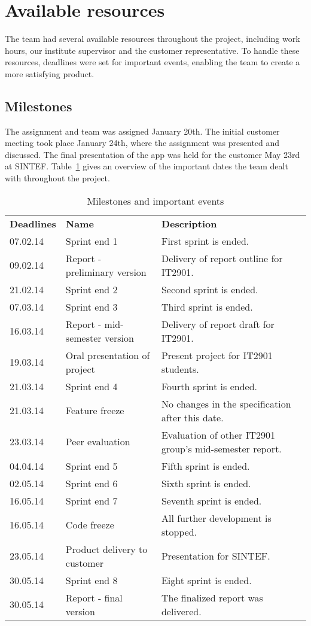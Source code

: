 \section{Available resources}
\label{sec:availResources}
The team had several available resources throughout the project, including work hours, our institute supervisor and the customer representative. To handle these resources, deadlines were set for important events, enabling the team to create a more satisfying product.

\subsection{Milestones}

The assignment and team was assigned January 20th. The initial customer meeting took place January 24th, where the assignment was presented and discussed. The final presentation of the app was held for the customer May 23rd at SINTEF. Table~\ref{tab:milestones} gives an overview of the important dates the team dealt with throughout the project. 

\begin{table}[H]
\centering
{}
\begin{tabular}{|l|l|p{8cm}|}
\hline
\textbf{Deadlines} & \textbf{Name} & \textbf{Description}\\
07.02.14 & Sprint end 1 & First sprint is ended. \\
09.02.14& Report - preliminary version & Delivery of report outline for IT2901.\\
21.02.14& Sprint end 2 & Second sprint is ended. \\
07.03.14& Sprint end 3 & Third sprint is ended.\\
16.03.14& Report - mid-semester version &  Delivery of report draft for IT2901. \\
19.03.14 & Oral presentation of project & Present project for IT2901 students.\\
21.03.14& Sprint end 4 & Fourth sprint is ended.\\
21.03.14 & Feature freeze & No changes in the specification after this date.
\\
23.03.14 & Peer evaluation &  Evaluation of other IT2901 group's mid-semester report. \\
04.04.14& Sprint end 5 & Fifth sprint is ended.\\
02.05.14& Sprint end 6 & Sixth sprint is ended.\\
16.05.14& Sprint end 7 & Seventh sprint is ended.\\
16.05.14& Code freeze & All further development is stopped.\\
23.05.14& Product delivery to customer & Presentation for SINTEF.\\ 
30.05.14& Sprint end 8 & Eight sprint is ended.\\
30.05.14 & Report - final version & The finalized report was delivered.\\\hline
\end{tabular}
\caption{Milestones and important events}
\label{tab:milestones}
\end{table}

